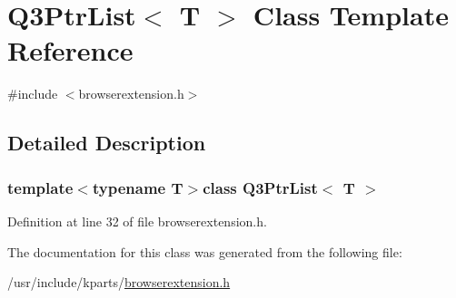 \hypertarget{classQ3PtrList}{\section{Q3\+Ptr\+List$<$ T $>$ Class Template Reference}
\label{classQ3PtrList}
}


{\ttfamily \#include $<$browserextension.\+h$>$}



\subsection{Detailed Description}
\subsubsection*{template$<$typename T$>$class Q3\+Ptr\+List$<$ T $>$}



Definition at line 32 of file browserextension.\+h.



The documentation for this class was generated from the following file\+:\begin{DoxyCompactItemize}
\item 
/usr/include/kparts/\hyperlink{browserextension_8h}{browserextension.\+h}\end{DoxyCompactItemize}

